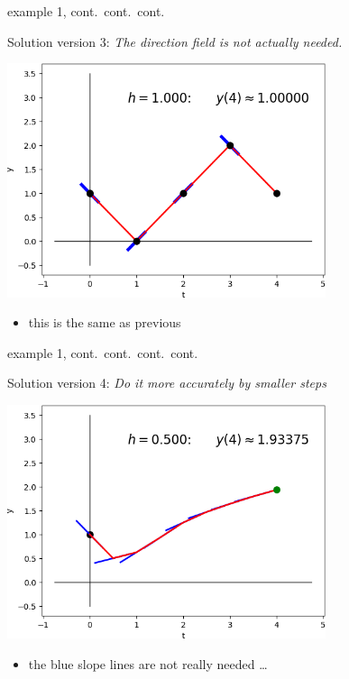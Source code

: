\documentclass{beamer}
\begin{document}
\begin{frame}{example 1, cont.~cont.~cont.}

Solution version 3: \emph{The direction field is not actually needed.}

\bigskip
\hfill \includegraphics[width=0.7\textwidth]{figs/sequence-3}

\begin{itemize}
\item this is the same as previous
\end{itemize}
\end{frame}


\begin{frame}{example 1, cont.~cont.~cont.~cont.}

Solution version 4: \emph{Do it more accurately by smaller steps}

\bigskip
\hfill \includegraphics[width=0.7\textwidth]{figs/sequence-4}

\begin{itemize}
\item the blue slope lines are not really needed \dots
\end{itemize}
\end{frame}
\end{document}
